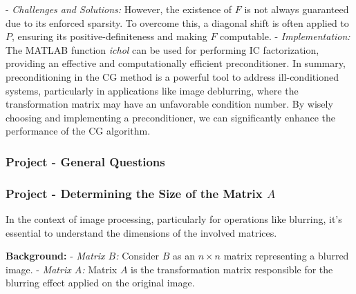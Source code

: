 \documentclass[unicode,11pt,a4paper,oneside,numbers=endperiod,openany]{scrartcl}
\begin{document}
- \textit{Challenges and Solutions:} However, the existence of \( F \) is not always guaranteed due to its enforced sparsity. To overcome this, a diagonal shift is often applied to \( P \), ensuring its positive-definiteness and making \( F \) computable.\newline\newline
- \textit{Implementation:} The MATLAB function \textit{ichol} can be used for performing IC factorization, providing an effective and computationally efficient preconditioner.
\newline\newline
In summary, preconditioning in the CG method is a powerful tool to address ill-conditioned systems, particularly in applications like image deblurring, where the transformation matrix may have an unfavorable condition number. By wisely choosing and implementing a preconditioner, we can significantly enhance the performance of the CG algorithm.

\subsubsection{Project - General Questions}
\subsubsection{Project - Determining the Size of the Matrix \( A \)}
In the context of image processing, particularly for operations like blurring, it's essential to understand the dimensions of the involved matrices.\newline

\textbf{Background:}
- \textit{Matrix \( B \):} Consider \( B \) as an \( n \times n \) matrix representing a blurred image.
- \textit{Matrix \( A \):} Matrix \( A \) is the transformation matrix responsible for the blurring effect applied on the original image.
\end{document}
